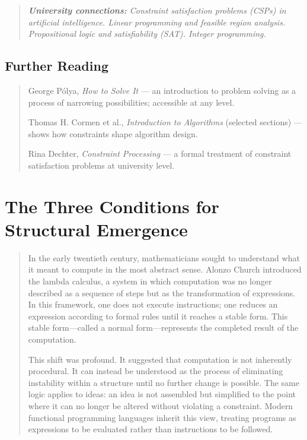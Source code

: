 \documentclass[11pt]{book}
\theoremstyle{plain}
\theoremstyle{definition}
\theoremstyle{remark}
\newenvironment{historicalpreamble}
  {\begin{quote}\small}
  {\end{quote}}
\newenvironment{universitybridge}
  {\begin{quote}\small\itshape\textbf{University connections:}\normalfont\small\itshape\enspace\ignorespaces}
  {\end{quote}}
\newenvironment{readinglist}
  {\begin{quote}\small}
  {\end{quote}}
\begin{document}
\begin{universitybridge}
Constraint satisfaction problems (CSPs) in artificial intelligence.
Linear programming and feasible region analysis. Propositional logic
and satisfiability (SAT). Integer programming.
\end{universitybridge}

\section*{Further Reading}

\begin{readinglist}
George P\'olya, \textit{How to Solve It} --- an introduction to
problem solving as a process of narrowing possibilities; accessible at
any level.

Thomas H. Cormen et al., \textit{Introduction to Algorithms} (selected
sections) --- shows how constraints shape algorithm design.

Rina Dechter, \textit{Constraint Processing} --- a formal treatment of
constraint satisfaction problems at university level.
\end{readinglist}

\chapter{The Three Conditions for Structural Emergence}

\begin{historicalpreamble}
In the early twentieth century, mathematicians sought to understand what it
meant to compute in the most abstract sense. Alonzo Church introduced the
lambda calculus, a system in which computation was no longer described as
a sequence of steps but as the transformation of expressions. In this
framework, one does not execute instructions; one reduces an expression
according to formal rules until it reaches a stable form. This stable
form---called a normal form---represents the completed result of the
computation.

This shift was profound. It suggested that computation is not inherently
procedural. It can instead be understood as the process of eliminating
instability within a structure until no further change is possible. The
same logic applies to ideas: an idea is not assembled but simplified to
the point where it can no longer be altered without violating a constraint.
Modern functional programming languages inherit this view, treating programs
as expressions to be evaluated rather than instructions to be followed.
\end{historicalpreamble}
\end{document}
